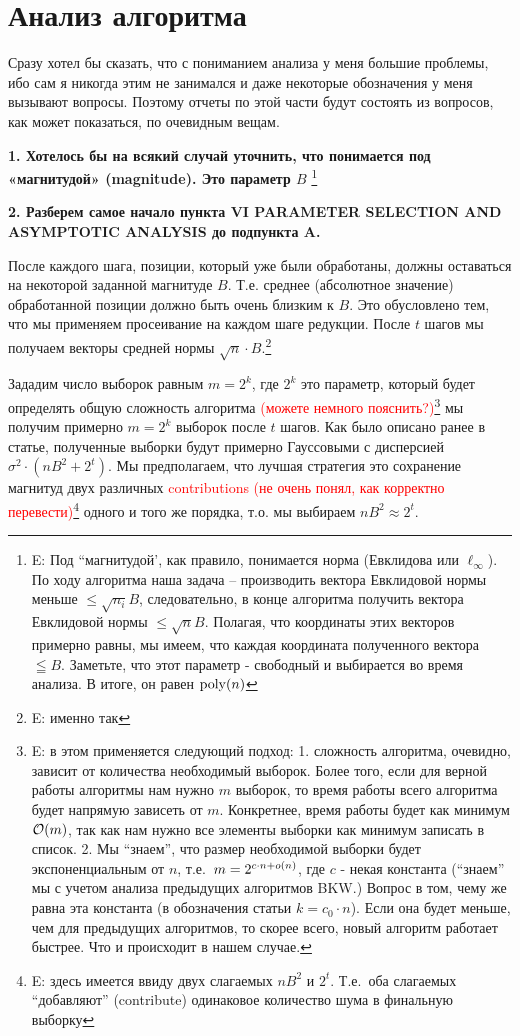 \documentclass[a4paper,11pt]{article}
\begin{document}
\section{Анализ алгоритма}

Сразу хотел бы сказать, что с пониманием анализа у меня большие проблемы, ибо сам я никогда этим не занимался и даже некоторые обозначения у меня вызывают вопросы. Поэтому отчеты по этой части будут состоять из вопросов, как может показаться, по очевидным вещам.

\textbf{1. Хотелось бы на всякий случай уточнить, что понимается под «магнитудой» (magnitude). Это параметр $B$ } \footnote{E: 
Под ``магнитудой', как правило, понимается норма (Евклидова или $\ell_\infty$). По ходу алгоритма наша задача -- производить вектора  Евклидовой нормы меньше $\leq \sqrt{n_i}B$, следовательно, в конце алгоритма получить вектора Евклидовой нормы $ \leq \sqrt{n}B$. Полагая, что координаты этих векторов примерно равны, мы имеем, что каждая координата полученного вектора $\leqq B$. Заметьте, что этот параметр - свободный и выбирается во время анализа. В итоге, он равен $\mathrm{poly}(n)$
} 

\textbf{2. Разберем самое начало пункта VI PARAMETER SELECTION AND ASYMPTOTIC ANALYSIS до подпункта A.}

После каждого шага, позиции, который уже были обработаны, должны оставаться на некоторой заданной магнитуде $B$. Т.е. среднее (абсолютное значение) обработанной позиции должно быть очень близким к $B$. Это обусловлено тем, что мы применяем просеивание на каждом шаге редукции. После $t$ шагов мы получаем векторы средней нормы $\sqrt{n}\cdot B$.\footnote{E: именно так} 

Зададим число выборок равным ${m=2^k}$, где $2^k$ это параметр, который будет определять общую сложность алгоритма \textcolor{red}{(можете немного пояснить?)}\footnote{E: в этом применяется следующий подход: 1. сложность алгоритма, очевидно, зависит от количества необходимый выборок. Более того, если для верной работы алгоритмы нам нужно $m$ выборок, то время работы всего алгоритма будет напрямую зависеть от $m$. Конкретнее, время работы будет как минимум $\mathcal{O}(m)$, так как нам нужно все элементы выборки как минимум записать в список. 2. Мы ``знаем'', что размер необходимой выборки  будет экспоненциальным от $n$, т.е.\ $m = 2^{c \cdot n + o(n) }$, где $c$ - некая константа (``знаем'' мы с учетом анализа предыдущих алгоритмов BKW.) Вопрос в том, чему же равна эта константа (в обозначения статьи $k=c_0 \cdot n$). Если она будет меньше, чем для предыдущих алгоритмов, то скорее всего, новый алгоритм работает быстрее. Что и происходит в нашем случае.}
мы получим примерно $m=2^k$ выборок после $t$ шагов. Как было описано ранее в статье, полученные выборки будут примерно Гауссовыми с дисперсией $\sigma^2\cdot(nB^2+2^t)$. Мы предполагаем, что лучшая стратегия это сохранение магнитуд двух различных \textcolor{red}{contributions (не очень понял, как корректно перевести)}\footnote{E: здесь имеется ввиду двух слагаемых $nB^2$ и $2^t$. Т.е.\ оба слагаемых ``добавляют'' (contribute) одинаковое количество шума в финальную выборку} одного и того же порядка, т.о. мы выбираем $nB^2 \approx 2^t$.
\end{document}
